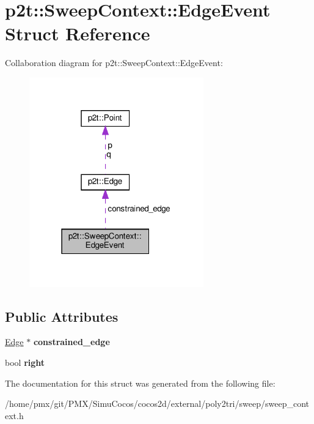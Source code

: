 \hypertarget{structp2t_1_1SweepContext_1_1EdgeEvent}{}\section{p2t\+:\+:Sweep\+Context\+:\+:Edge\+Event Struct Reference}
\label{structp2t_1_1SweepContext_1_1EdgeEvent}


Collaboration diagram for p2t\+:\+:Sweep\+Context\+:\+:Edge\+Event\+:
\nopagebreak
\begin{figure}[H]
\begin{center}
\leavevmode
\includegraphics[width=214pt]{structp2t_1_1SweepContext_1_1EdgeEvent__coll__graph}
\end{center}
\end{figure}
\subsection*{Public Attributes}
\begin{DoxyCompactItemize}
\item 
\mbox{\label{structp2t_1_1SweepContext_1_1EdgeEvent_ac6052aa7cdcd9f8ca826696f3ac54301}} 
\hyperlink{structp2t_1_1Edge}{Edge} $\ast$ {\bfseries constrained\+\_\+edge}
\item 
\mbox{\label{structp2t_1_1SweepContext_1_1EdgeEvent_a7970343e9690e97ad56d1f6e47ba0c5d}} 
bool {\bfseries right}
\end{DoxyCompactItemize}


The documentation for this struct was generated from the following file\+:\begin{DoxyCompactItemize}
\item 
/home/pmx/git/\+P\+M\+X/\+Simu\+Cocos/cocos2d/external/poly2tri/sweep/sweep\+\_\+context.\+h\end{DoxyCompactItemize}
